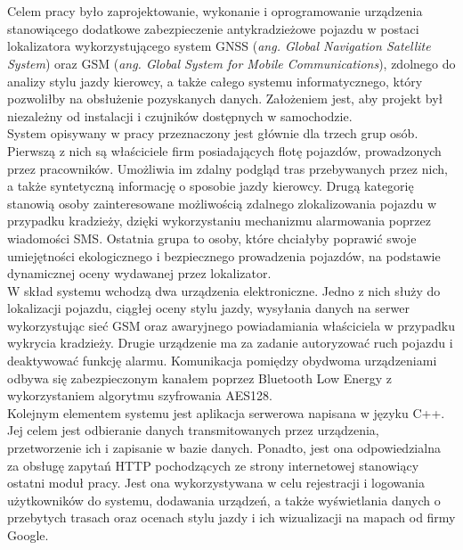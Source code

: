 \thispagestyle{empty}
\\

\\

\begin{singlespacing}

Celem pracy było zaprojektowanie, wykonanie i oprogramowanie urządzenia stanowiącego dodatkowe zabezpieczenie antykradzieżowe pojazdu w postaci lokalizatora wykorzystującego system GNSS (\textit{ang. Global Navigation Satellite System}) oraz GSM (\textit{ang. Global System for Mobile Communications}), zdolnego do analizy stylu jazdy kierowcy, a także całego systemu informatycznego, który pozwoliłby na obsłużenie pozyskanych danych. Założeniem jest, aby projekt był niezależny od instalacji i czujników dostępnych w samochodzie.\\

System opisywany w pracy przeznaczony jest głównie dla trzech grup osób. Pierwszą z nich są właściciele firm posiadających flotę pojazdów, prowadzonych przez pracowników. Umożliwia im zdalny podgląd tras przebywanych przez nich, a także syntetyczną informację o sposobie jazdy kierowcy. Drugą kategorię stanowią osoby zainteresowane możliwością zdalnego zlokalizowania pojazdu w przypadku kradzieży, dzięki wykorzystaniu mechanizmu alarmowania poprzez wiadomości SMS. Ostatnia grupa to osoby, które chciałyby poprawić swoje umiejętności ekologicznego i bezpiecznego prowadzenia pojazdów, na podstawie dynamicznej oceny wydawanej przez lokalizator. \\

W skład systemu wchodzą dwa urządzenia elektroniczne. Jedno z nich służy do lokalizacji pojazdu, ciągłej oceny stylu jazdy, wysyłania danych na serwer wykorzystując sieć GSM oraz awaryjnego powiadamiania właściciela w przypadku wykrycia kradzieży. Drugie urządzenie ma za zadanie autoryzować ruch pojazdu i deaktywować funkcję alarmu. Komunikacja pomiędzy obydwoma urządzeniami odbywa się zabezpieczonym kanałem poprzez Bluetooth Low Energy z wykorzystaniem algorytmu szyfrowania AES128. \\

Kolejnym elementem systemu jest aplikacja serwerowa napisana w języku C++. Jej celem jest odbieranie danych transmitowanych przez urządzenia, przetworzenie ich i zapisanie w bazie danych. Ponadto, jest ona odpowiedzialna za obsługę zapytań HTTP pochodzących ze strony internetowej stanowiący ostatni moduł pracy. Jest ona wykorzystywana w celu rejestracji i logowania użytkowników do systemu, dodawania urządzeń, a także wyświetlania danych o przebytych trasach oraz ocenach stylu jazdy i ich wizualizacji na mapach od firmy Google. \\


\end{singlespacing}
